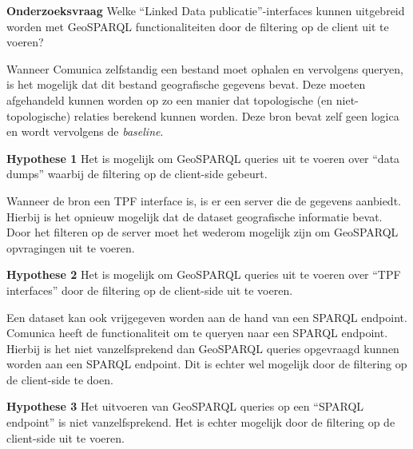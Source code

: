 \textbf{Onderzoeksvraag} Welke “Linked Data publicatie”-interfaces kunnen uitgebreid worden met GeoSPARQL functionaliteiten door de filtering op de client uit te voeren?

Wanneer Comunica zelfstandig een bestand moet ophalen en vervolgens queryen, is het mogelijk dat dit bestand geografische gegevens bevat. Deze moeten afgehandeld kunnen worden op zo een manier dat topologische (en niet-topologische) relaties berekend kunnen worden. Deze bron bevat zelf geen logica en wordt vervolgens de \textit{baseline}.

\textbf{Hypothese 1} Het is mogelijk om GeoSPARQL queries uit te voeren over ``data dumps'' waarbij de filtering op de client-side gebeurt.

Wanneer de bron een TPF interface is, is er een server die de gegevens aanbiedt. Hierbij is het opnieuw mogelijk dat de dataset geografische informatie bevat. Door het filteren op de server moet het wederom mogelijk zijn om GeoSPARQL opvragingen uit te voeren.

\textbf{Hypothese 2} Het is mogelijk om GeoSPARQL queries uit te voeren over ``TPF interfaces'' door de filtering op de client-side uit te voeren.

Een dataset kan ook vrijgegeven worden aan de hand van een SPARQL endpoint. Comunica heeft de functionaliteit om te queryen naar een SPARQL endpoint. Hierbij is het niet vanzelfsprekend dan GeoSPARQL queries opgevraagd kunnen worden aan een SPARQL endpoint. Dit is echter wel mogelijk door de filtering op de client-side te doen.

\textbf{Hypothese 3} Het uitvoeren van GeoSPARQL queries op een ``SPARQL endpoint'' is niet vanzelfsprekend. Het is echter mogelijk door de filtering op de client-side uit te voeren.